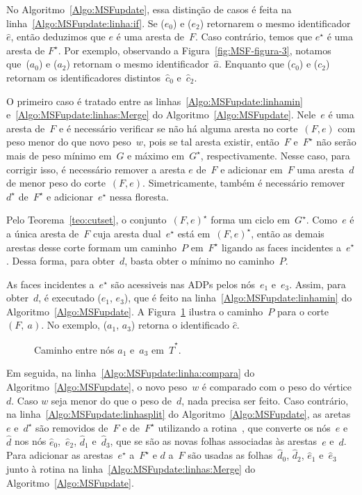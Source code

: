 No Algoritmo~\ref{Algo:MSFupdate}, essa distinção de casos é feita na linha~\ref{Algo:MSFupdate:linha:if}.
Se \LCOFindNode($e_0$) e \LCOFindNode($e_2$) retornarem o mesmo identificador~$\hat e$, então deduzimos que $e$ é uma aresta de~$F$.
Caso contrário, temos que $e^\star$ é uma aresta de $F^\star$.
Por exemplo, observando a Figura~\ref{fig:MSF-figura-3}, notamos que~\LCOFindNode($a_0$) e \LCOFindNode($a_2$) retornam o mesmo identificador~$\hat a$.
Enquanto que \LCOFindNode($c_0$) e \LCOFindNode($c_2$) retornam os identificadores distintos~$\hat c_0$ e~$\hat c_2$.

O primeiro caso é tratado entre as linhas~\ref{Algo:MSFupdate:linhamin} e~\ref{Algo:MSFupdate:linhas:Merge} do Algoritmo~\ref{Algo:MSFupdate}.
Nele~$e$ é uma aresta de~$F$ e é necessário verificar se não há alguma aresta no corte~$(F, e)$ com peso menor do que novo peso~$w$, pois se tal aresta existir, então~$F$ e~$F^\star$ não serão mais de peso mínimo em~$G$ e máximo em~$G^\star$, respectivamente.
Nesse caso, para corrigir isso, é necessário remover a aresta $e$ de~$F$ e adicionar em~$F$ uma aresta~$d$ de menor peso do corte~$(F, e)$.
Simetricamente, também é necessário remover $d^\star$ de~$F^\star$ e adicionar~$e^\star$ nessa floresta.

Pelo Teorema~\ref{teo:cutset}, o conjunto~$(F, e)^\star$ forma um ciclo em~$G^\star$.
Como~$e$ é a única aresta de~$F$ cuja aresta dual~$e^\star$ está em~$(F, e)^\star$, então as demais arestas desse corte formam um caminho~$P$ em~$F^\star$ ligando as faces incidentes a~$e^\star$.
Dessa forma, para obter~$d$, basta obter o mínimo no caminho~$P$.

As faces incidentes a~$e^\star$ são acessiveis nas ADPs pelos nós~$e_1$ e~$e_3$.
Assim, para obter~$d$, é executado \LCOMin($e_1$, $e_3$), que é feito na linha~\ref{Algo:MSFupdate:linhamin} do Algoritmo~\ref{Algo:MSFupdate}.
A Figura~\ref{fig:MSF-figura-5} ilustra o caminho~$P$ para o corte $(F,~a)$.
No exemplo, \LCOMin($a_1$, $a_3$) retorna o identificado $\hat c$.


\begin{figure}[htb]
\scalebox{1.2}{
\centering

}
\caption{Caminho entre nós $a_1$ e~$a_3$ em~$\hat T^\star$.}
\label{fig:MSF-figura-5}
\end{figure}

Em seguida, na linha~\ref{Algo:MSFupdate:linha:compara} do Algoritmo~\ref{Algo:MSFupdate}, o novo peso~$w$ é comparado com o peso do vértice~$d$.
Caso $w$ seja menor do que o peso de~$d$, nada precisa ser feito.
Caso contrário, na linha~\ref{Algo:MSFupdate:linhasplit} do Algoritmo~\ref{Algo:MSFupdate}, as aretas~$e$ e~$d^\star$ são removidos de~$F$ e de~$F^\star$ utilizando a rotina~\LCOSplit{}, que converte os nós~$\hat e$ e~$\hat d$ nos nós $\hat e_0$,~$\hat e_2$, $\hat d_1$ e~$\hat d_3$, que se são as novas folhas associadas às arestas~$e$ e~$d$.
Para adicionar as arestas~$e^\star$ a~$F^\star$ e $d$ a~$F$ são usadas as folhas~$\hat d_0$, $\hat d_2$, $\hat e_1$ e~$\hat e_3$ junto à rotina \LCOMerge{} na linha~\ref{Algo:MSFupdate:linhas:Merge} do Algoritmo~\ref{Algo:MSFupdate}.

